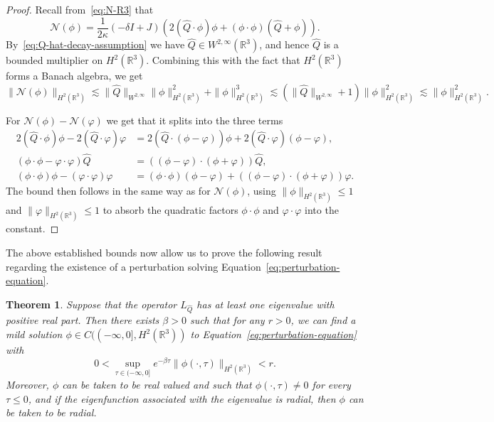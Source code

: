 \documentclass[11pt]{article}
\newtheorem{theorem}[definition]{Theorem}
\begin{document}
\begin{proof}
  Recall from~\eqref{eq:N-R3} that
  \begin{equation*}
    \mathcal{N}(\phi) = \frac{1}{2\kappa}(-\delta I + J)
    \left(2(\hat{Q} \cdot \phi)\phi + (\phi\cdot\phi)(\hat{Q} + \phi)\right).
  \end{equation*}
  By~\eqref{eq:Q-hat-decay-assumption} we have
  \(\hat{Q} \in W^{2,\infty}(\mathbb{R}^{3})\), and hence \(\hat{Q}\)
  is a bounded multiplier on \(H^{2}(\mathbb{R}^{3})\). Combining this
  with the fact that \(H^{2}(\mathbb{R}^{3})\) forms a Banach algebra,
  we get
  \begin{equation*}
    \|\mathcal{N}(\phi)\|_{H^{2}(\mathbb{R}^{3})}
    \lesssim \|\hat{Q}\|_{W^{2,\infty}}\|\phi\|_{H^{2}(\mathbb{R}^{3})}^{2} + \|\phi\|_{H^{2}(\mathbb{R}^{3})}^{3}
    \lesssim (\|\hat{Q}\|_{W^{2,\infty}} + 1)\|\phi\|_{H^{2}(\mathbb{R}^{3})}^{2}
    \lesssim \|\phi\|_{H^{2}(\mathbb{R}^{3})}^{2}.
  \end{equation*}

  For \(\mathcal{N}(\phi) - \mathcal{N}(\varphi)\) we get that it
  splits into the three terms
  \begin{align*}
    2(\hat{Q} \cdot \phi)\phi - 2(\hat{Q} \cdot \varphi)\varphi
    &= 2(\hat{Q} \cdot (\phi - \varphi))\phi + 2(\hat{Q} \cdot \varphi)(\phi - \varphi),\\
    (\phi\cdot\phi - \varphi\cdot\varphi)\hat{Q}
    &= ((\phi - \varphi) \cdot (\phi + \varphi))\hat{Q},\\
    (\phi\cdot\phi)\phi - (\varphi\cdot\varphi)\varphi
    &= (\phi\cdot\phi)(\phi - \varphi) + ((\phi - \varphi) \cdot (\phi + \varphi))\varphi.
  \end{align*}
  The bound then follows in the same way as for \(\mathcal{N}(\phi)\),
  using \(\|\phi\|_{H^{2}(\mathbb{R}^{3})} \leq 1\) and
  \(\|\varphi\|_{H^{2}(\mathbb{R}^{3})} \leq 1\) to absorb the
  quadratic factors \(\phi\cdot\phi\) and \(\varphi\cdot\varphi\) into
  the constant.
\end{proof}

The above established bounds now allow us to prove the following
result regarding the existence of a perturbation solving
Equation~\eqref{eq:perturbation-equation}.

\begin{theorem}\label{thm:decaying-solution}
  Suppose that the operator \(L_{\hat{Q}}\) has at least one
  eigenvalue with positive real part. Then there exists \(\beta > 0\)
  such that for any \(r > 0\), we can find a mild solution
  \(\phi \in C((-\infty, 0], H^{2}(\mathbb{R}^{3}))\) to
  Equation~\eqref{eq:perturbation-equation} with
  \begin{equation*}
    0 < \sup_{\tau \in (-\infty, 0]} e^{-\beta\tau}\|\phi(\cdot, \tau)\|_{H^{2}(\mathbb{R}^{3})} < r.
  \end{equation*}
  Moreover, \(\phi\) can be taken to be real valued and such that
  \(\phi(\cdot, \tau) \neq 0\) for every \(\tau \leq 0\), and if the
  eigenfunction associated with the eigenvalue is radial, then
  \(\phi\) can be taken to be radial.
\end{theorem}
\end{document}
